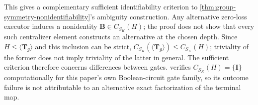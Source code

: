 This gives a complementary sufficient identifiability criterion to
\cref{thm:group-symmetry-nonidentifiability}'s ambiguity construction.
Any alternative zero-loss executor induces a nonidentity
$\bm B\in C_{S_K}(H)$; the proof does not show that every such centralizer
element constructs an alternative at the chosen depth.
Since $H\le\langle\bm T_g\rangle$ and this inclusion can be strict,
$C_{S_K}(\langle\bm T_g\rangle)\le C_{S_K}(H)$; triviality of the former
does not imply triviality of the latter in general. The sufficient
criterion therefore concerns differences between gates.
 verifies $C_{S_K}(H)=\{\bm I\}$
computationally for this paper's own Boolean-circuit gate family, so its
outcome failure is not attributable to an alternative exact factorization
of the terminal map.

